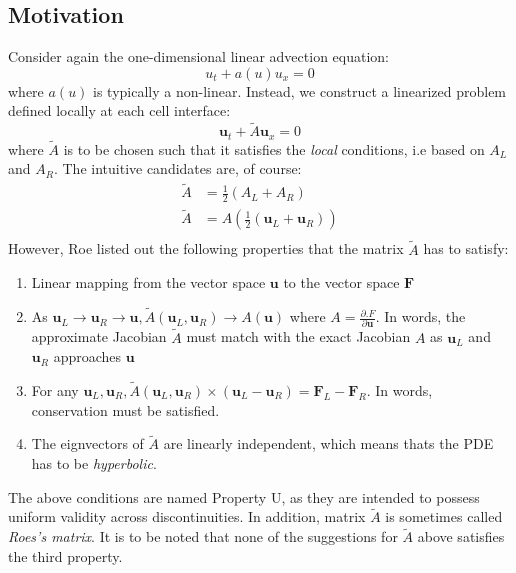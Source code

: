 \documentclass[a4paper]{article}
\numberwithin{equation}{section}
\begin{document}
\subsection{Motivation}
Consider again the one-dimensional linear advection equation:
\begin{equation}
    u_t + a(u)u_x = 0
\end{equation}
where $a(u)$ is typically a non-linear. Instead, we construct a linearized problem defined locally at each cell interface:
\begin{equation}
    \mathbf{u}_t + \tilde{A}\mathbf{u}_x = 0
\end{equation}
where $\tilde{A}$ is to be chosen such that it satisfies the \textit{local} conditions, i.e based on $A_L$ and $A_R$. The intuitive candidates are, of course:
\begin{equation}
    \begin{split}
        \tilde{A} &= \frac{1}{2}(A_L + A_R)\\
        \tilde{A} &= A(\frac{1}{2}(\mathbf{u}_L + \mathbf{u}_R))\\
    \end{split}
\end{equation}
However, Roe listed out the following properties that the matrix $\tilde{A}$ has to satisfy:
\begin{enumerate}
    \item Linear mapping from the vector space $\mathbf{u}$ to the vector space $\mathbf{F}$
    \item As $\mathbf{u}_L \rightarrow \mathbf{u}_R \rightarrow \mathbf{u}, \tilde{A}(\mathbf{u}_L,\mathbf{u}_R) \rightarrow A(\mathbf{u})$ where $A = \frac{\partial \mathbf.
    F}{\partial \mathbf{u}}$. In words, the approximate Jacobian $\tilde{A}$ must match with the exact Jacobian $A$ as $\mathbf{u}_L$ and $\mathbf{u}_R$ approaches $\mathbf{u}$
    \item For any $\mathbf{u}_L, \mathbf{u}_R, \tilde{A}(\mathbf{u}_L, \mathbf{u}_R)\times (\mathbf{u}_L - \mathbf{u}_R) = \mathbf{F}_L - \mathbf{F}_R$. In words, conservation must be satisfied.
    \item The eignvectors of $\tilde{A}$ are linearly independent, which means thats the PDE has to be \textit{hyperbolic}.

\end{enumerate}
The above conditions are named Property U, as they are intended to possess uniform validity across discontinuities. In addition, matrix $\tilde{A}$ is sometimes called \textit{Roes's matrix}. It is to be noted that none of the suggestions for $\tilde{A}$ above satisfies the third property. 
\end{document}
